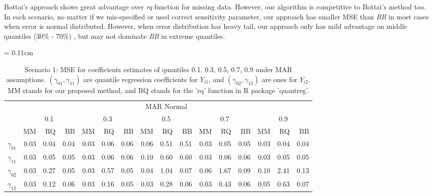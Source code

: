 \documentclass[12pt]{article}
\begin{document}
Bottai's approach shows great advantage over \textit{rq} function for
missing data. However, our algorithm is competitive to Bottai's method
too. In each scenario, no matter if we mis-specified or used correct
sensitivity parameter, our approach has smaller MSE than \textit{BB}
in most cases when error is normal distributed. However, when error
distribution has heavy tail, our approach only has mild advantage on
middle quantiles (30\% - 70\%) , but may not dominate \textit{BB} in
extreme quantiles.

\begin{table}[ht]
  \renewcommand{\arraystretch}{1.3}
  \centering
  \caption{Scenario 1: MSE for coefficients estimates of quantiles
    0.1, 0.3, 0.5, 0.7, 0.9 under MAR assumptions. $(\gamma_{01}, \gamma_{11})$
    are quantile regression coefficients for $Y_{i1}$, and $(\gamma_{02}, \gamma_{12})$
    are ones for $Y_{i2}$. MM stands for our proposed method, and RQ stands for the 'rq'
    function in R package 'quantreg'.}\label{tab:simh2}
  \vspace{10pt}
  \tabcolsep = 0.11cm
  \begin{tabular}{rrrrrrrrrrrrrrrr}
    \toprule
    & \multicolumn{15}{c}{MAR Normal} \\
    \cline{2-16}
    &  \multicolumn{3}{c}{0.1} &  \multicolumn{3}{c}{0.3} &  \multicolumn{3}{c}{0.5} &
    \multicolumn{3}{c}{0.7} &  \multicolumn{3}{c}{0.9} \\
    \cline{2-16}
    & MM   & RQ   & BB   & MM   & RQ   & BB   & MM   & RQ   & BB   & MM   & RQ   & BB   & MM   & RQ   & BB   \\
    \hline
    $\gamma_{01}$ & 0.03 & 0.04 & 0.04 & 0.03 & 0.06 & 0.06 & 0.06 & 0.51 & 0.51 & 0.03 & 0.05 & 0.05 & 0.03 & 0.04 & 0.04 \\
    $\gamma_{11}$ & 0.03 & 0.05 & 0.05 & 0.03 & 0.06 & 0.06 & 0.10 & 0.60 & 0.60 & 0.03 & 0.06 & 0.06 & 0.03 & 0.05 & 0.05 \\
    $\gamma_{02}$ & 0.03 & 0.27 & 0.05 & 0.03 & 0.57 & 0.05 & 0.04 & 1.04 & 0.07 & 0.06 & 1.67 & 0.09 & 0.10 & 2.41 & 0.13 \\
    $\gamma_{12}$ & 0.03 & 0.12 & 0.06 & 0.03 & 0.16 & 0.05 & 0.03 & 0.28 & 0.06 & 0.03 & 0.43 & 0.06 & 0.05 & 0.63 & 0.07 \\
    \bottomrule
  \end{tabular}


\end{table}
\end{document}
